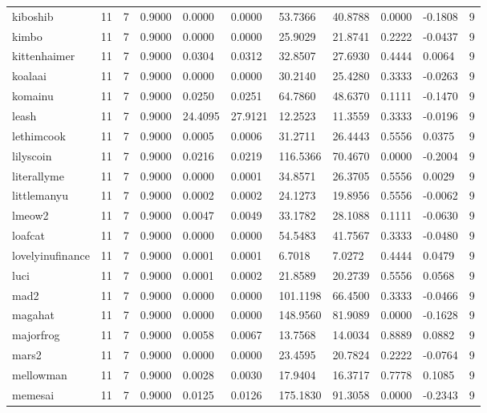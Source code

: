 \begin{table}[htbp]
\begin{tabular}{lllllllllll}
kiboshib & 11 & 7 & 0.9000 & 0.0000 & 0.0000 & 53.7366 & 40.8788 & 0.0000 & -0.1808 & 9 \\
kimbo & 11 & 7 & 0.9000 & 0.0000 & 0.0000 & 25.9029 & 21.8741 & 0.2222 & -0.0437 & 9 \\
kittenhaimer & 11 & 7 & 0.9000 & 0.0304 & 0.0312 & 32.8507 & 27.6930 & 0.4444 & 0.0064 & 9 \\
koalaai & 11 & 7 & 0.9000 & 0.0000 & 0.0000 & 30.2140 & 25.4280 & 0.3333 & -0.0263 & 9 \\
komainu & 11 & 7 & 0.9000 & 0.0250 & 0.0251 & 64.7860 & 48.6370 & 0.1111 & -0.1470 & 9 \\
leash & 11 & 7 & 0.9000 & 24.4095 & 27.9121 & 12.2523 & 11.3559 & 0.3333 & -0.0196 & 9 \\
lethimcook & 11 & 7 & 0.9000 & 0.0005 & 0.0006 & 31.2711 & 26.4443 & 0.5556 & 0.0375 & 9 \\
lilyscoin & 11 & 7 & 0.9000 & 0.0216 & 0.0219 & 116.5366 & 70.4670 & 0.0000 & -0.2004 & 9 \\
literallyme & 11 & 7 & 0.9000 & 0.0000 & 0.0001 & 34.8571 & 26.3705 & 0.5556 & 0.0029 & 9 \\
littlemanyu & 11 & 7 & 0.9000 & 0.0002 & 0.0002 & 24.1273 & 19.8956 & 0.5556 & -0.0062 & 9 \\
lmeow2 & 11 & 7 & 0.9000 & 0.0047 & 0.0049 & 33.1782 & 28.1088 & 0.1111 & -0.0630 & 9 \\
loafcat & 11 & 7 & 0.9000 & 0.0000 & 0.0000 & 54.5483 & 41.7567 & 0.3333 & -0.0480 & 9 \\
lovelyinufinance & 11 & 7 & 0.9000 & 0.0001 & 0.0001 & 6.7018 & 7.0272 & 0.4444 & 0.0479 & 9 \\
luci & 11 & 7 & 0.9000 & 0.0001 & 0.0002 & 21.8589 & 20.2739 & 0.5556 & 0.0568 & 9 \\
mad2 & 11 & 7 & 0.9000 & 0.0000 & 0.0000 & 101.1198 & 66.4500 & 0.3333 & -0.0466 & 9 \\
magahat & 11 & 7 & 0.9000 & 0.0000 & 0.0000 & 148.9560 & 81.9089 & 0.0000 & -0.1628 & 9 \\
majorfrog & 11 & 7 & 0.9000 & 0.0058 & 0.0067 & 13.7568 & 14.0034 & 0.8889 & 0.0882 & 9 \\
mars2 & 11 & 7 & 0.9000 & 0.0000 & 0.0000 & 23.4595 & 20.7824 & 0.2222 & -0.0764 & 9 \\
mellowman & 11 & 7 & 0.9000 & 0.0028 & 0.0030 & 17.9404 & 16.3717 & 0.7778 & 0.1085 & 9 \\
memesai & 11 & 7 & 0.9000 & 0.0125 & 0.0126 & 175.1830 & 91.3058 & 0.0000 & -0.2343 & 9 \\

\end{tabular}
\end{table}
